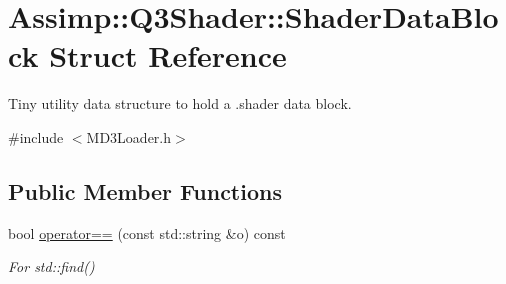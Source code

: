 \hypertarget{struct_assimp_1_1_q3_shader_1_1_shader_data_block}{\section{Assimp\+:\+:Q3\+Shader\+:\+:Shader\+Data\+Block Struct Reference}
\label{struct_assimp_1_1_q3_shader_1_1_shader_data_block}
}


Tiny utility data structure to hold a .shader data block.  




{\ttfamily \#include $<$M\+D3\+Loader.\+h$>$}

\subsection*{Public Member Functions}
\begin{DoxyCompactItemize}
\item 
\hypertarget{struct_assimp_1_1_q3_shader_1_1_shader_data_block_af78f341414c32e52de4c08ec2e120523}{bool \hyperlink{struct_assimp_1_1_q3_shader_1_1_shader_data_block_af78f341414c32e52de4c08ec2e120523}{operator==} (const std\+::string \&o) const }\label{struct_assimp_1_1_q3_shader_1_1_shader_data_block_af78f341414c32e52de4c08ec2e120523}

\begin{DoxyCompactList}\small\item\em For std\+::find() \end{DoxyCompactList}\end{DoxyCompactItemize}
